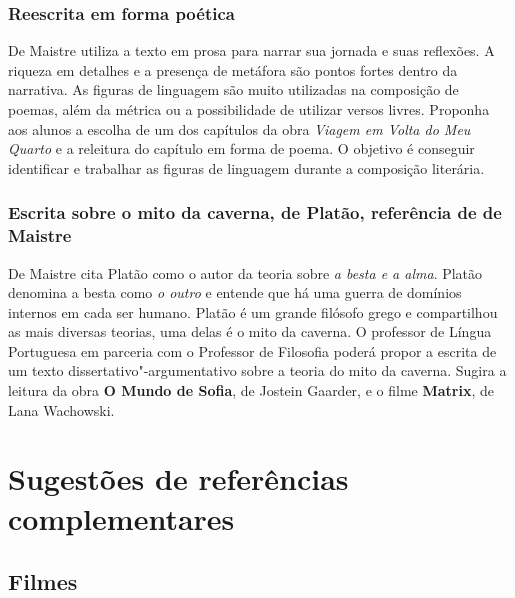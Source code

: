 \documentclass[12pt]{extarticle}
\begin{document}
\subsubsection{Reescrita em forma poética}

De Maistre utiliza a texto em prosa para narrar sua jornada e suas
reflexões. A riqueza em detalhes e a presença de metáfora são pontos
fortes dentro da narrativa. As figuras de linguagem são muito
utilizadas na composição de poemas, além da métrica ou a possibilidade
de utilizar versos livres. Proponha aos alunos a escolha de um dos
capítulos da obra \emph{Viagem em Volta do Meu Quarto} e a releitura do
capítulo em forma de poema. O objetivo é conseguir identificar e
trabalhar as figuras de linguagem durante a composição literária.

\subsubsection{Escrita sobre o mito da caverna, de Platão, referência de de Maistre}

De Maistre cita Platão como o autor da teoria sobre \emph{a besta e a
alma}. Platão denomina a besta como \emph{o outro} e entende que há
uma guerra de domínios internos em cada ser humano. Platão é um grande
filósofo grego 
e compartilhou as mais diversas teorias, uma delas é o mito da caverna.
O professor de Língua Portuguesa em parceria com o Professor de
Filosofia poderá propor a escrita de um texto dissertativo"-argumentativo
sobre a teoria do mito da caverna. Sugira a leitura da obra \textbf{O
Mundo de Sofia}, de Jostein Gaarder, e o filme \textbf{Matrix}, de Lana
Wachowski.

\section{Sugestões de referências complementares}\label{sugestoes}

\subsection{Filmes}
\end{document}

